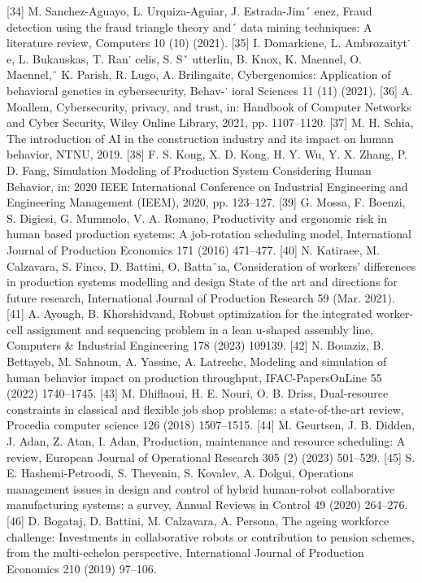 [34]	M. Sanchez-Aguayo, L. Urquiza-Aguiar, J. Estrada-Jim´ enez, Fraud detection using the fraud triangle theory and´ data mining techniques: A literature review, Computers 10 (10) (2021).
[35]	I. Domarkiene, L. Ambrozaityt˙ e, L. Bukauskas, T. Ran˙ celis, S. Sˇ utterlin, B. Knox, K. Maennel, O. Maennel,¨ K. Parish, R. Lugo, A. Brilingaite, Cybergenomics: Application of behavioral genetics in cybersecurity, Behav-˙ ioral Sciences 11 (11) (2021).
[36]	A. Moallem, Cybersecurity, privacy, and trust, in: Handbook of Computer Networks and Cyber Security, Wiley
Online Library, 2021, pp. 1107–1120.
[37]	M. H. Schia, The introduction of AI in the construction industry and its impact on human behavior, NTNU,
2019.
[38]	F. S. Kong, X. D. Kong, H. Y. Wu, Y. X. Zhang, P. D. Fang, Simulation Modeling of Production System Considering Human Behavior, in: 2020 IEEE International Conference on Industrial Engineering and Engineering Management (IEEM), 2020, pp. 123–127.
[39]	G. Mossa, F. Boenzi, S. Digiesi, G. Mummolo, V. A. Romano, Productivity and ergonomic risk in human based production systems: A job-rotation scheduling model, International Journal of Production Economics 171 (2016) 471–477.
[40]	N. Katiraee, M. Calzavara, S. Finco, D. Battini, O. Batta¨ıa, Consideration of workers’ differences in production systems modelling and design State of the art and directions for future research, International Journal of Production Research 59 (Mar. 2021).
[41]	A. Ayough, B. Khorshidvand, Robust optimization for the integrated worker-cell assignment and sequencing problem in a lean u-shaped assembly line, Computers & Industrial Engineering 178 (2023) 109139.
[42]	N. Bouaziz, B. Bettayeb, M. Sahnoun, A. Yassine, A. Latreche, Modeling and simulation of human behavior impact on production throughput, IFAC-PapersOnLine 55 (2022) 1740–1745.
[43]	M. Dhiflaoui, H. E. Nouri, O. B. Driss, Dual-resource constraints in classical and flexible job shop problems: a state-of-the-art review, Procedia computer science 126 (2018) 1507–1515.
[44]	M. Geurtsen, J. B. Didden, J. Adan, Z. Atan, I. Adan, Production, maintenance and resource scheduling: A review, European Journal of Operational Research 305 (2) (2023) 501–529.
[45]	S. E. Hashemi-Petroodi, S. Thevenin, S. Kovalev, A. Dolgui, Operations management issues in design and control of hybrid human-robot collaborative manufacturing systems: a survey, Annual Reviews in Control 49 (2020) 264–276.
[46]	D. Bogataj, D. Battini, M. Calzavara, A. Persona, The ageing workforce challenge: Investments in collaborative robots or contribution to pension schemes, from the multi-echelon perspective, International Journal of Production Economics 210 (2019) 97–106.
